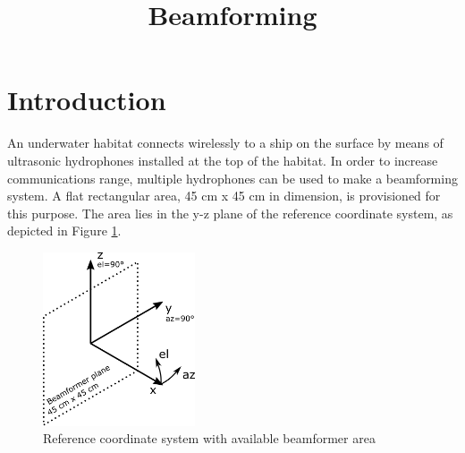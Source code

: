 \documentclass{article}[a4paper]
\title{Beamforming}
\begin{document}
\maketitle

\section*{Introduction}

An underwater habitat connects wirelessly to a ship on the surface by means of ultrasonic hydrophones installed at the top of the habitat. In order to increase communications range, multiple hydrophones can be used to make a beamforming system. A flat rectangular area, 45 cm x 45 cm in dimension, is provisioned for this purpose. The area lies in the y-z plane of the reference coordinate system, as depicted in Figure \ref{fig:coord}.
\begin{figure}[h!]
   \centering
   \includegraphics[width=0.4\textwidth]{coord.png}
   \caption{Reference coordinate system with available beamformer area}
   \label{fig:coord}
\end{figure}
\end{document}
